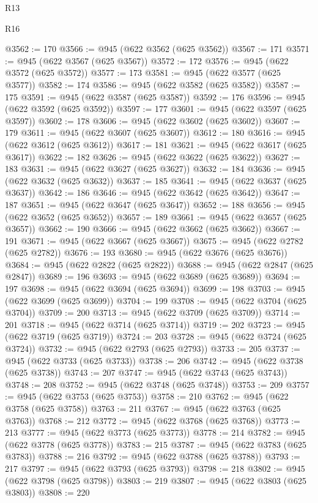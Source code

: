 \begin{lexlean}{R13}
\begin{lexlean}{R16}
\begin{coremodule}
{{{{{{{{{{{{{{{{{{{{{{{{{{{{{{{{{{{{{{{{{{{{{{{{{{{{{{{{{{{{{{{{{{{{{{{{{{{{{{{{{{{{{{{{{{{{{{{{{{{{{{{{{{{{{{{{{@3562 := 170
@3566 := @945 (@622 @3562 (@625 @3562))
@3567 := 171
@3571 := @945 (@622 @3567 (@625 @3567))
@3572 := 172
@3576 := @945 (@622 @3572 (@625 @3572))
@3577 := 173
@3581 := @945 (@622 @3577 (@625 @3577))
@3582 := 174
@3586 := @945 (@622 @3582 (@625 @3582))
@3587 := 175
@3591 := @945 (@622 @3587 (@625 @3587))
@3592 := 176
@3596 := @945 (@622 @3592 (@625 @3592))
@3597 := 177
@3601 := @945 (@622 @3597 (@625 @3597))
@3602 := 178
@3606 := @945 (@622 @3602 (@625 @3602))
@3607 := 179
@3611 := @945 (@622 @3607 (@625 @3607))
@3612 := 180
@3616 := @945 (@622 @3612 (@625 @3612))
@3617 := 181
@3621 := @945 (@622 @3617 (@625 @3617))
@3622 := 182
@3626 := @945 (@622 @3622 (@625 @3622))
@3627 := 183
@3631 := @945 (@622 @3627 (@625 @3627))
@3632 := 184
@3636 := @945 (@622 @3632 (@625 @3632))
@3637 := 185
@3641 := @945 (@622 @3637 (@625 @3637))
@3642 := 186
@3646 := @945 (@622 @3642 (@625 @3642))
@3647 := 187
@3651 := @945 (@622 @3647 (@625 @3647))
@3652 := 188
@3656 := @945 (@622 @3652 (@625 @3652))
@3657 := 189
@3661 := @945 (@622 @3657 (@625 @3657))
@3662 := 190
@3666 := @945 (@622 @3662 (@625 @3662))
@3667 := 191
@3671 := @945 (@622 @3667 (@625 @3667))
@3675 := @945 (@622 @2782 (@625 @2782))
@3676 := 193
@3680 := @945 (@622 @3676 (@625 @3676))
@3684 := @945 (@622 @2822 (@625 @2822))
@3688 := @945 (@622 @2847 (@625 @2847))
@3689 := 196
@3693 := @945 (@622 @3689 (@625 @3689))
@3694 := 197
@3698 := @945 (@622 @3694 (@625 @3694))
@3699 := 198
@3703 := @945 (@622 @3699 (@625 @3699))
@3704 := 199
@3708 := @945 (@622 @3704 (@625 @3704))
@3709 := 200
@3713 := @945 (@622 @3709 (@625 @3709))
@3714 := 201
@3718 := @945 (@622 @3714 (@625 @3714))
@3719 := 202
@3723 := @945 (@622 @3719 (@625 @3719))
@3724 := 203
@3728 := @945 (@622 @3724 (@625 @3724))
@3732 := @945 (@622 @2793 (@625 @2793))
@3733 := 205
@3737 := @945 (@622 @3733 (@625 @3733))
@3738 := 206
@3742 := @945 (@622 @3738 (@625 @3738))
@3743 := 207
@3747 := @945 (@622 @3743 (@625 @3743))
@3748 := 208
@3752 := @945 (@622 @3748 (@625 @3748))
@3753 := 209
@3757 := @945 (@622 @3753 (@625 @3753))
@3758 := 210
@3762 := @945 (@622 @3758 (@625 @3758))
@3763 := 211
@3767 := @945 (@622 @3763 (@625 @3763))
@3768 := 212
@3772 := @945 (@622 @3768 (@625 @3768))
@3773 := 213
@3777 := @945 (@622 @3773 (@625 @3773))
@3778 := 214
@3782 := @945 (@622 @3778 (@625 @3778))
@3783 := 215
@3787 := @945 (@622 @3783 (@625 @3783))
@3788 := 216
@3792 := @945 (@622 @3788 (@625 @3788))
@3793 := 217
@3797 := @945 (@622 @3793 (@625 @3793))
@3798 := 218
@3802 := @945 (@622 @3798 (@625 @3798))
@3803 := 219
@3807 := @945 (@622 @3803 (@625 @3803))
@3808 := 220
}}}}}}}}}}}}}}}}}}}}}}}}}}}}}}}}}}}}}}}}}}}}}}}}}}}}}}}}}}}}}}}}}}}}}}}}}}}}}}}}}}}}}}}}}}}}}}}}}}}}}}}}}}}}}}}}}
\end{coremodule}
\end{lexlean}
\end{lexlean}
